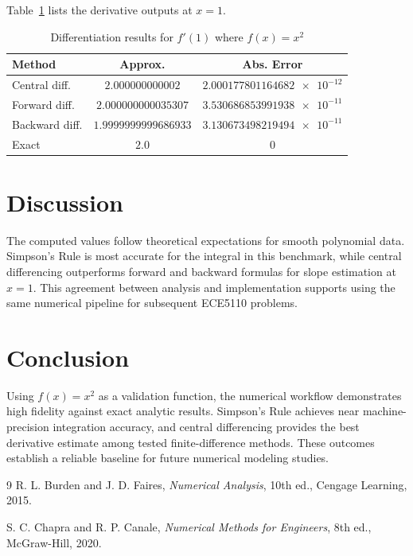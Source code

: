 \documentclass[letterpaper,twocolumn,fleqn]{article}
\begin{document}
Table~\ref{tab:diff} lists the derivative outputs at $x=1$.

\begin{table}[h!]
\caption{Differentiation results for $f'(1)$ where $f(x)=x^2$}
\label{tab:diff}
\centering
{\small
\setlength{\tabcolsep}{3pt}
\begin{tabular}{|l|c|c|}
\hline
Method & Approx. & Abs. Error \\\hline
Central diff. & $\num{2.000000000002}$ & $\num{2.000177801164682e-12}$ \\\hline
Forward diff. & $\num{2.000000000035307}$ & $\num{3.530686853991938e-11}$ \\\hline
Backward diff. & $\num{1.9999999999686933}$ & $\num{3.130673498219494e-11}$ \\\hline
Exact & $\num{2.0}$ & $\num{0}$ \\\hline
\end{tabular}
}
\end{table}

\section{Discussion}
The computed values follow theoretical expectations for smooth polynomial data. Simpson's Rule is most accurate for the integral in this benchmark, while central differencing outperforms forward and backward formulas for slope estimation at $x=1$. This agreement between analysis and implementation supports using the same numerical pipeline for subsequent ECE5110 problems.

\section{Conclusion}
Using $f(x)=x^2$ as a validation function, the numerical workflow demonstrates high fidelity against exact analytic results. Simpson's Rule achieves near machine-precision integration accuracy, and central differencing provides the best derivative estimate among tested finite-difference methods. These outcomes establish a reliable baseline for future numerical modeling studies.

\small
\begin{thebibliography}{9}
R. L. Burden and J. D. Faires, \emph{Numerical Analysis}, 10th ed., Cengage Learning, 2015.

S. C. Chapra and R. P. Canale, \emph{Numerical Methods for Engineers}, 8th ed., McGraw-Hill, 2020.
\end{thebibliography}
\end{document}

